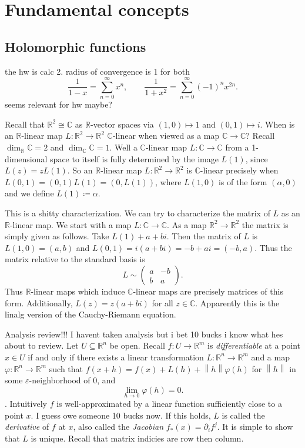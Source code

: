 \chapter{Fundamental concepts}

\section{Holomorphic functions}

the hw is calc 2. radius of convergence is 1 for both
\[
	\frac{1}{1-x} =\sum_{n=0}^{\infty} x^n,\qquad \frac{1}{1+x^2} =\sum_{n=0}^{\infty} (-1)^nx^{2n} 
.\]
seems relevant for hw maybe?

Recall that $\mathbb{R} ^2\cong \mathbb{C} $ as $\mathbb{R} $-vector spaces via $(1,0)\mapsto 1$ and $(0,1)\mapsto i$. When is an $\mathbb{R} $-linear map $L : \mathbb{R} ^2 \to \mathbb{R} ^2$ $\mathbb{C} $-linear when viewed as a map $\mathbb{C} \to \mathbb{C} $? Recall $\dim _\mathbb{R} \mathbb{C} =2$ and $\dim _\mathbb{C} \mathbb{C} =1$. Well a $\mathbb{C} $-linear map $L : \mathbb{C}  \to \mathbb{C} $ from a 1-dimensional space to itself is fully determined by the image $L(1)$, since $L(z)=zL(1)$. So an $\mathbb{R} $-linear map $L : \mathbb{R} ^2 \to \mathbb{R} ^2$ is $\mathbb{C} $-linear precisely when $L(0,1)=(0,1)L(1)=(0,L(1))$, where $L(1,0)$ is of the form $(\alpha ,0)$ and we define $L(1)\coloneqq \alpha $.

This is a shitty characterization. We can try to characterize the matrix of $L$ as an $\mathbb{R} $-linear map. We start with a map $L : \mathbb{C}  \to \mathbb{C} $. As a map $\mathbb{R} ^2\to \mathbb{R} ^2$ the matrix is simply given as follows. Take $L(1)+a+bi$. Then the matrix of $L$ is $L(1,0)=(a,b)$ and $L(0,1)=i(a+bi)=-b+ai=(-b,a)$. Thus the matrix relative to the standard basis is
\[
	L\sim \begin{pmatrix}
	a & -b \\
	b & a
	\end{pmatrix}
.\]
Thus $\mathbb{R} $-linear maps which induce $\mathbb{C} $-linear maps are precisely matrices of this form. Additionally, $L(z)=z(a+bi)$ for all $z\in\mathbb{C} $. Apparently this is the linalg version of the Cauchy-Riemann equation.

Analysis review!!! I havent taken analysis but i bet 10 bucks i know what hes about to review. Let $U\subseteq \mathbb{R} ^n$ be open. Recall $f : U \to \mathbb{R} ^m$ is \emph{differentiable} at a point $x\in U$ if and only if there exists a linear transformation $L : \mathbb{R} ^n \to \mathbb{R} ^m$ and a map $\varphi : \mathbb{R} ^n \to \mathbb{R} ^m$ such that $f(x+h)=f(x)+L(h)+\left\| h \right\| \varphi (h)$ for $\left\| h \right\|$ in some $\varepsilon $-neighborhood of $0$, and
\[
	\lim_{h \to 0} \varphi (h)=0
.\]
. Intuitively $f$ is well-approximated by a linear function sufficiently close to a point $x$. I guess owe someone 10 bucks now. If this holds, $L$ is called the \emph{derivative} of $f$ at $x$, also called the \emph{Jacobian} $f_*(x)=\partial _if^j$. It is simple to show that $L$ is unique. Recall that matrix indicies are row then column.

